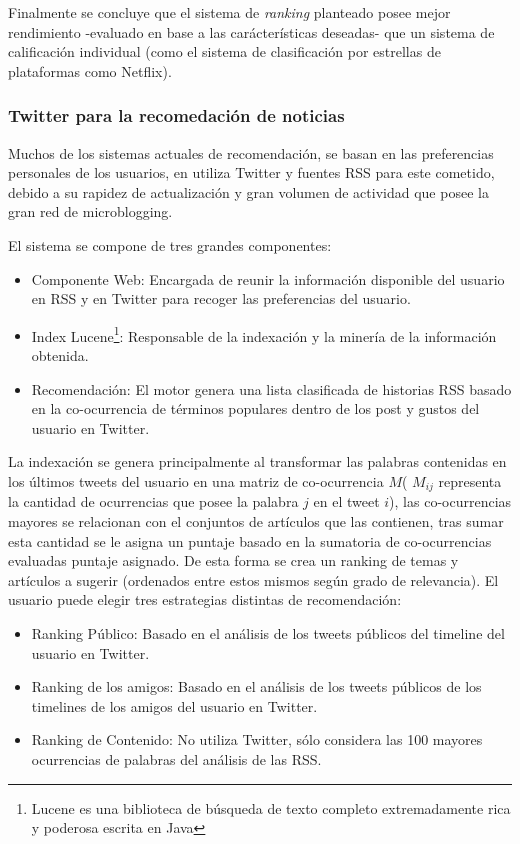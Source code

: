 	Finalmente se concluye que el sistema de \emph{ranking} planteado posee mejor rendimiento -evaluado en base a las carácterísticas deseadas- que un sistema de calificación individual (como el sistema de clasificación por estrellas de plataformas como Netflix).
	
\subsubsection{Twitter para la recomedación de noticias}

	Muchos de los sistemas actuales de recomendación, se basan en las preferencias personales de los usuarios, en \cite{Phelan:2009:UTR:1639714.1639794} utiliza Twitter y fuentes RSS para este cometido, debido a su rapidez de actualización y gran volumen de actividad que posee la gran red de microblogging.
	
	El sistema se compone de tres grandes componentes:
	\begin{itemize}
		\item Componente Web: Encargada de reunir la información disponible del usuario en RSS y en Twitter para recoger las preferencias del usuario.
		\item Index Lucene\footnote{Lucene es una biblioteca de búsqueda de texto completo extremadamente rica y poderosa escrita en Java}: Responsable de la indexación y la minería de la información obtenida.
		\item Recomendación: El motor genera una lista clasificada de historias RSS basado en la co-ocurrencia de términos populares dentro de los post y gustos del usuario en Twitter.
	\end{itemize}
	
	La indexación se genera principalmente al transformar las palabras contenidas en los últimos tweets del usuario 
	en una matriz de co-ocurrencia $M$( $M_{ij}$ representa la cantidad de ocurrencias que posee la palabra $j$ en
	el tweet $i$), las co-ocurrencias mayores se relacionan con el conjuntos de artículos que las contienen, tras sumar esta cantidad se le asigna un puntaje basado en la sumatoria de co-ocurrencias evaluadas puntaje asignado. De esta forma se crea un ranking de temas y artículos a sugerir (ordenados entre estos mismos según grado de relevancia). El usuario puede elegir tres estrategias distintas de recomendación: 
	
	\begin{itemize}
		\item Ranking Público: Basado en el análisis de los tweets públicos del timeline del usuario en Twitter.
		\item Ranking de los amigos: Basado en el análisis de los tweets públicos de los timelines de los amigos del usuario en Twitter.
		\item Ranking de Contenido: No utiliza Twitter, sólo considera las 100 mayores ocurrencias de palabras del análisis de las RSS.
	\end{itemize}
   

